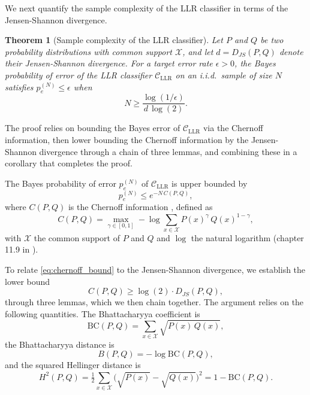\documentclass{article}
\newtheorem{theorem}{Theorem}
\begin{document}
We next quantify the sample complexity of the LLR classifier in terms of the Jensen-Shannon divergence.

\begin{theorem}[Sample complexity of the LLR classifier]
\label{thm:sample_complexity}
Let $P$ and $Q$ be two probability distributions with common support $\mathcal{X}$, and let $d = D_{JS}(P,Q)$ denote their Jensen-Shannon divergence. For a target error rate $\epsilon > 0$, the Bayes probability of error of the LLR classifier $\mathcal{C}_{\text{LLR}}$ on an i.i.d.\ sample of size $N$ satisfies $p_e^{(N)} \leq \epsilon$ when
\begin{equation}
    N \geq \frac{\log(1/\epsilon)}{d \, \log(2)}.
\label{eq:thm_N_bound}
\end{equation}
\end{theorem}

The proof relies on bounding the Bayes error of $\mathcal{C}_{\text{LLR}}$ via the Chernoff information, then lower bounding the Chernoff information by the Jensen-Shannon divergence through a chain of three lemmas, and combining these in a corollary that completes the proof.

The Bayes probability of error $p_e^{(N)}$ of $\mathcal{C}_{\text{LLR}}$ is upper bounded by 
\begin{equation}
    p_e^{(N)} \leq e^{-N\,C(P,Q)},
\label{eq:chernoff_bound}
\end{equation}
where $C(P,Q)$ is the Chernoff information \cite{chernoff_measure_1952}, defined as
\begin{equation}
    C(P,Q) = \max_{\gamma\in[0,1]} -\log \sum_{x\in\mathcal{X}} P(x)^{\gamma}\,Q(x)^{1-\gamma},
\label{eq:chernoff_def}
\end{equation}
with $\mathcal{X}$ the common support of $P$ and $Q$ and $\log$ the natural logarithm (chapter 11.9 in \cite{cover_elements_2005}).

To relate \eqref{eq:chernoff_bound} to the Jensen-Shannon divergence, we establish the lower bound
\begin{equation}
    C(P,Q) \geq \log(2)\cdot D_{JS}(P,Q),
\label{eq:chernoff_js_bound}
\end{equation}
through three lemmas, which we then chain together. The argument relies on the following quantities. The Bhattacharyya coefficient is
\begin{equation}
    \mathrm{BC}(P,Q) = \sum_{x\in\mathcal{X}} \sqrt{P(x)\,Q(x)},
\label{eq:bhattacharyya_coeff}
\end{equation}
the Bhattacharyya distance is
\begin{equation}
    B(P,Q) = -\log \mathrm{BC}(P,Q),
\label{eq:bhattacharyya_def}
\end{equation}
and the squared Hellinger distance is
\begin{equation}
    H^{2}(P,Q) = \tfrac{1}{2}\sum_{x\in\mathcal{X}} \big(\sqrt{P(x)} - \sqrt{Q(x)}\big)^{2}
    = 1 - \mathrm{BC}(P,Q).
\label{eq:hellinger_def}
\end{equation}
 
\end{document}
